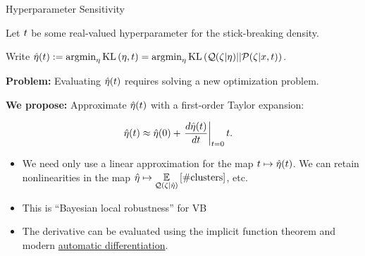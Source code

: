 \begin{frame}{Hyperparameter Sensitivity}

Let $t$ be some real-valued hyperparameter for the stick-breaking density.
\pause

Write $\hat\eta(t) := \operatorname*{\mathrm{argmin}}_{\eta} \mathrm{KL}\left(\eta, t\right) = \operatorname*{\mathrm{argmin}}_{\eta} \mathrm{KL}\left(\mathcal{Q}(\zeta \vert \eta) || \mathcal{P}(\zeta \vert x, t)\right)$.
\pause

{\bf Problem:} Evaluating $\hat\eta(t)$ requires solving a new optimization problem.
\pause


{\bf We propose: } Approximate $\hat\eta(t)$ with a first-order
Taylor expansion:

\begin{align*}
  \hat\eta(t)  &\approx  
  \hat\eta(0) + \left.\frac{d \hat\eta(t)}{d t}\right\vert_{t=0} t. 
\end{align*}
%
\pause
%
\vspace{-0.5em}
\begin{itemize}
\item<5-> We need only use a linear approximation for the map $t \mapsto \hat\eta(t)$. We can retain nonlinearities in the map 
$\hat\eta \mapsto \underset{\mathcal{Q}(\zeta \vert \hat\eta)}{\mathbb{E}}\left[\#\text{clusters}\right]
$, etc.
\vspace{0.5em}
\item<6-> This is ``Bayesian local robustness'' for VB \citep[cf.][]{gustafson:1996:local}
\vspace{0.5em}
\item<7-> The derivative can be evaluated using the implicit function theorem
and modern
{\color{blue} \href{https://jax.readthedocs.io/en/latest/}{automatic differentiation}}.
\end{itemize}
\end{frame}







